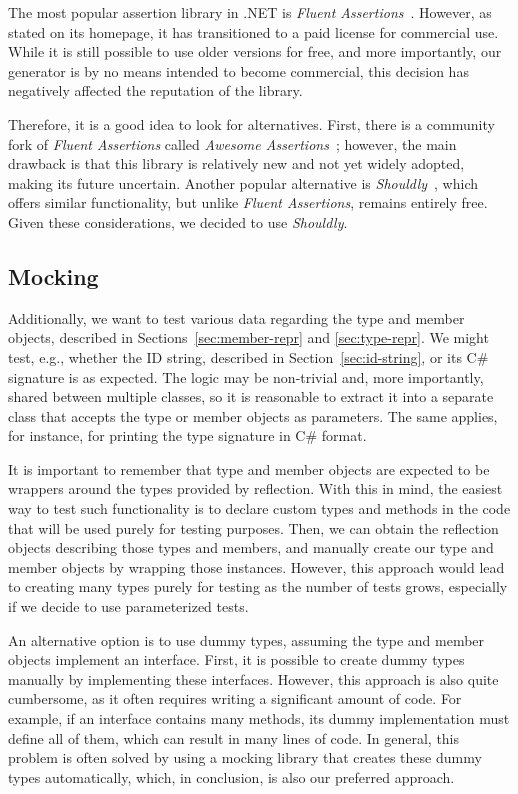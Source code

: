 The most popular assertion library in .NET is \textit{Fluent Assertions}~\cite{fluent_assertions}.
However, as stated on its homepage, it has transitioned to a paid license for commercial use.
While it is still possible to use older versions for free, and more importantly, our generator is by no means intended to become commercial, this decision has negatively affected the reputation of the library.

Therefore, it is a good idea to look for alternatives.
First, there is a community fork of \textit{Fluent Assertions} called \textit{Awesome Assertions}~\cite{awesome_assertions}; however, the main drawback is that this library is relatively new and not yet widely adopted, making its future uncertain.
Another popular alternative is \textit{Shouldly}~\cite{shouldly}, which offers similar functionality, but unlike \textit{Fluent Assertions}, remains entirely free.
Given these considerations, we decided to use \textit{Shouldly}.

\subsection*{Mocking}
\label{sec:tests-mocking-explanation}

Additionally, we want to test various data regarding the type and member objects, described in 
Sections~\ref{sec:member-repr} and \ref{sec:type-repr}.
We might test, e.g., whether the ID string, described in Section~\ref{sec:id-string}, or its C\# signature is as expected.
The logic may be non-trivial and, more importantly, shared between multiple classes, so it is reasonable to extract it into a separate class that accepts the type or member objects as parameters.
The same applies, for instance, for printing the type signature in C\# format.

It is important to remember that type and member objects are expected to be wrappers around the types provided by reflection.
With this in mind, the easiest way to test such functionality is to declare custom types and methods in the code that will be used purely for testing purposes.
Then, we can obtain the reflection objects describing those types and members, and manually create our type and member objects by wrapping those instances.
However, this approach would lead to creating many types purely for testing as the number of tests grows, especially if we decide to use parameterized tests.

An alternative option is to use dummy types, assuming the type and member objects implement an interface.
First, it is possible to create dummy types manually by implementing these interfaces.
However, this approach is also quite cumbersome, as it often requires writing a significant amount of code.
For example, if an interface contains many methods, its dummy implementation must define all of them, which can result in many lines of code.
In general, this problem is often solved by using a mocking library that creates these dummy types automatically, which, in conclusion, is also our preferred approach.

